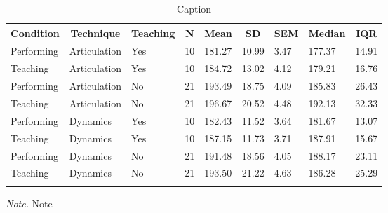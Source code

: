 \documentclass[
  man,floatsintext]{apa6}
\begin{document}
\begin{table}[tbp]

\begin{center}
\begin{threeparttable}

\caption{\label{tab:ioi-teaching-desc-1}Caption}

\begin{tabular}{lllllllll}
\toprule
Condition & \multicolumn{1}{c}{Technique} & \multicolumn{1}{c}{Teaching} & \multicolumn{1}{c}{N} & \multicolumn{1}{c}{Mean} & \multicolumn{1}{c}{SD} & \multicolumn{1}{c}{SEM} & \multicolumn{1}{c}{Median} & \multicolumn{1}{c}{IQR}\\
\midrule
Performing & Articulation & Yes & 10 & 181.27 & 10.99 & 3.47 & 177.37 & 14.91\\
Teaching & Articulation & Yes & 10 & 184.72 & 13.02 & 4.12 & 179.21 & 16.76\\
Performing & Articulation & No & 21 & 193.49 & 18.75 & 4.09 & 185.83 & 26.43\\
Teaching & Articulation & No & 21 & 196.67 & 20.52 & 4.48 & 192.13 & 32.33\\
Performing & Dynamics & Yes & 10 & 182.43 & 11.52 & 3.64 & 181.67 & 13.07\\
Teaching & Dynamics & Yes & 10 & 187.15 & 11.73 & 3.71 & 187.91 & 15.67\\
Performing & Dynamics & No & 21 & 191.48 & 18.56 & 4.05 & 188.17 & 23.11\\
Teaching & Dynamics & No & 21 & 193.50 & 21.22 & 4.63 & 186.28 & 25.29\\
\bottomrule
\addlinespace
\end{tabular}

\begin{tablenotes}[para]
\normalsize{\textit{Note.} Note}
\end{tablenotes}

\end{threeparttable}
\end{center}

\end{table}
\end{document}
